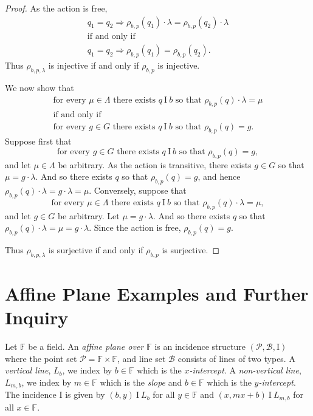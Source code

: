 \documentclass[11pt]{article}
\theoremstyle{definition}
\begin{document}
\begin{proof}
As the action is free, 
\begin{gather*}
q_1 = q_2 \Longrightarrow \rho_{b,p}(q_1) \cdot \lambda = \rho_{b,p}(q_2) \cdot \lambda \\
\text{if and only if} \\
q_1 = q_2 \Longrightarrow \rho_{b,p}(q_1) = \rho_{b,p}(q_2).
\end{gather*}
Thus $\rho_{b,p,\lambda}$ is injective if and only if $\rho_{b,p}$ is injective.

We now show that 
\begin{gather*}
\text{for every } \mu \in \Lambda \text{ there exists } q \ \mathrm{I} \ b \text{ so that } \rho_{b,p}(q) \cdot \lambda = \mu \\
\text{if and only if} \\
\text{for every } g \in G \text{ there exists } q \ \mathrm{I} \ b \text{ so that } \rho_{b,p}(q) = g.
\end{gather*}
Suppose first that $$\text{for every } g \in G \text{ there exists } q \ \mathrm{I} \ b \text{ so that } \rho_{b,p}(q) = g,$$ and let $\mu \in \Lambda$ be arbitrary.  As the action is transitive, there exists $g \in G$ so that $\mu = g \cdot \lambda$.  And so there exists $q$ so that $\rho_{b,p}(q) = g$, and hence $\rho_{b,p}(q) \cdot \lambda = g \cdot \lambda = \mu$.  Conversely, suppose that  $$\text{for every } \mu \in \Lambda \text{ there exists } q \ \mathrm{I} \ b \text{ so that } \rho_{b,p}(q) \cdot \lambda = \mu,$$ and let $g \in G$ be arbitrary.  Let $\mu = g \cdot \lambda$.  And so there exists $q$ so that $\rho_{b,p}(q) \cdot \lambda = \mu = g \cdot \lambda$.  Since the action is free, $\rho_{b,p}(q)  = g $.

Thus $\rho_{b,p,\lambda}$ is surjective if and only if $\rho_{b,p}$ is surjective.
\end{proof}

\section{Affine Plane Examples and Further Inquiry}

Let $\mathbb{F}$ be a field.  An \textit{affine plane over $\mathbb{F}$} is an incidence structure $(\mathscr{P},\mathscr{B},\mathrm{I})$ where the point set $\mathscr{P} = \mathbb{F} \times \mathbb{F}$, and line set $\mathscr{B}$ consists of lines of two types.  A \textit{vertical line}, $L_b$,  we index by $b \in \mathbb{F}$ which is the \textit{$x$-intercept}.  A \textit{non-vertical line}, $L_{m,b}$, we index by $m \in \mathbb{F}$ which is the \textit{slope} and $b \in \mathbb{F}$ which is the \textit{$y$-intercept}.  The incidence $\mathrm{I}$ is given by $(b,y) \  \mathrm{I} \  L_b$ for all $y \in \mathbb{F}$ and $(x,mx+b) \  \mathrm{I} \  L_{m,b}$ for all $x \in \mathbb{F}$.
\end{document}

